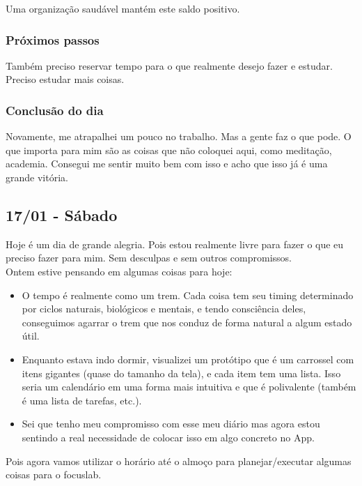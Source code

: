 \documentclass[11pt]{article}
\begin{document}
Uma organização saudável mantém este saldo positivo.

\subsubsection{Próximos passos}

Também preciso reservar tempo para o que realmente desejo fazer e estudar. Preciso estudar mais coisas.

\subsubsection{Conclusão do dia}

Novamente, me atrapalhei um pouco no trabalho. Mas a gente faz o que pode. O que importa para mim são as coisas que não coloquei aqui, como meditação, academia. Consegui me sentir muito bem com isso e acho que isso já é uma grande vitória.

\subsection{17/01 - Sábado}

Hoje é um dia de grande alegria. Pois estou realmente livre para fazer o que eu preciso fazer para mim. Sem desculpas e sem outros compromissos.\\

Ontem estive pensando em algumas coisas para hoje:

\begin{itemize}
    \item O tempo é realmente como um trem. Cada coisa tem seu timing determinado por ciclos naturais, biológicos e mentais, e tendo consciência deles, conseguimos agarrar o trem que nos conduz de forma natural a algum estado útil.
    \item Enquanto estava indo dormir, visualizei um protótipo que é um carrossel com itens gigantes (quase do tamanho da tela), e cada item tem uma lista. Isso seria um calendário em uma forma mais intuitiva e que é polivalente (também é uma lista de tarefas, etc.).
    \item Sei que tenho meu compromisso com esse meu diário mas agora estou sentindo a real necessidade de colocar isso em algo concreto no App.
\end{itemize}

Pois agora vamos utilizar o horário até o almoço para planejar/executar algumas coisas para o focuslab.\\
\end{document}
